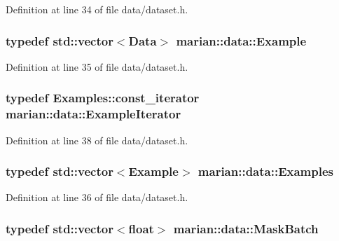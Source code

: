Definition at line 34 of file data/dataset.\+h.

\subsubsection[{\texorpdfstring{Example}{Example}}]{\setlength{\rightskip}{0pt plus 5cm}typedef std\+::vector$<${\bf Data}$>$ {\bf marian\+::data\+::\+Example}}\hypertarget{namespacemarian_1_1data_a901337b17eea9c054bbf11a10254bd7b}{}\label{namespacemarian_1_1data_a901337b17eea9c054bbf11a10254bd7b}


Definition at line 35 of file data/dataset.\+h.

\subsubsection[{\texorpdfstring{Example\+Iterator}{ExampleIterator}}]{\setlength{\rightskip}{0pt plus 5cm}typedef Examples\+::const\+\_\+iterator {\bf marian\+::data\+::\+Example\+Iterator}}\hypertarget{namespacemarian_1_1data_a45ade1945852d979da7433e0d4456bff}{}\label{namespacemarian_1_1data_a45ade1945852d979da7433e0d4456bff}


Definition at line 38 of file data/dataset.\+h.

\subsubsection[{\texorpdfstring{Examples}{Examples}}]{\setlength{\rightskip}{0pt plus 5cm}typedef std\+::vector$<${\bf Example}$>$ {\bf marian\+::data\+::\+Examples}}\hypertarget{namespacemarian_1_1data_a39201a9c7e3f08ea31141ec770b60868}{}\label{namespacemarian_1_1data_a39201a9c7e3f08ea31141ec770b60868}


Definition at line 36 of file data/dataset.\+h.

\subsubsection[{\texorpdfstring{Mask\+Batch}{MaskBatch}}]{\setlength{\rightskip}{0pt plus 5cm}typedef std\+::vector$<$float$>$ {\bf marian\+::data\+::\+Mask\+Batch}}\hypertarget{namespacemarian_1_1data_a0cdbf7ceb1b0dd97d13828c95ccd76d4}{}\label{namespacemarian_1_1data_a0cdbf7ceb1b0dd97d13828c95ccd76d4}


